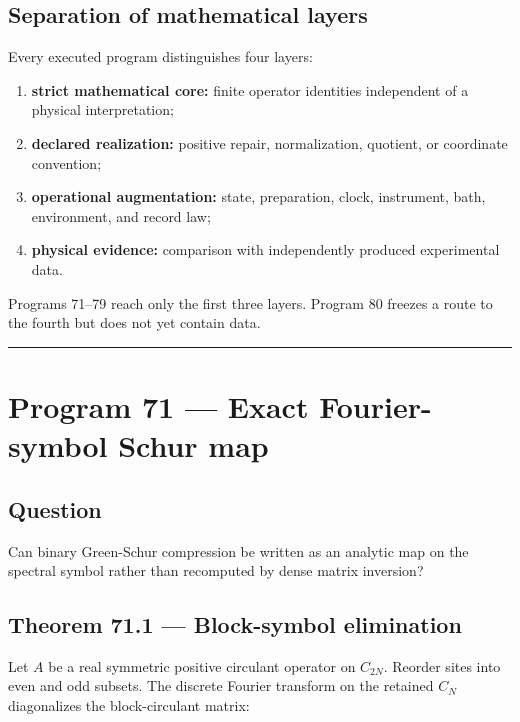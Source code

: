 \documentclass[11pt,a4paper,openany]{report}
\begin{document}
\section{Separation of mathematical layers}

Every executed program distinguishes four layers:

\begin{enumerate}
\item 
\textbf{strict mathematical core:} finite operator identities independent of a physical interpretation;

\item 
\textbf{declared realization:} positive repair, normalization, quotient, or coordinate convention;

\item 
\textbf{operational augmentation:} state, preparation, clock, instrument, bath, environment, and record law;

\item 
\textbf{physical evidence:} comparison with independently produced experimental data.

\end{enumerate}

Programs 71--79 reach only the first three layers. Program 80 freezes a route to the fourth but does not yet contain data.

\par\medskip\hrule\medskip

\chapter{Program 71 --- Exact Fourier-symbol Schur map}

\section{Question}

Can binary Green-Schur compression be written as an analytic map on the spectral symbol rather than recomputed by dense matrix inversion?

\section{Theorem 71.1 --- Block-symbol elimination}

Let \(A\) be a real symmetric positive circulant operator on \(C_{2N}\). Reorder sites into even and odd subsets. The discrete Fourier transform on the retained \(C_N\) diagonalizes the block-circulant matrix:
\end{document}
